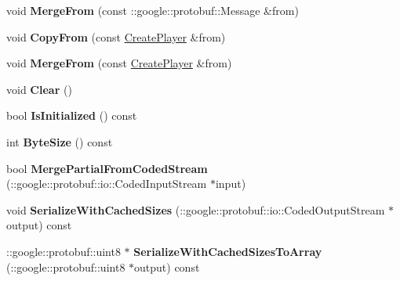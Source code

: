 \begin{DoxyCompactItemize}
\item 
\hypertarget{class_create_player_ac69c59b01e955b2f6b54b187d37645a4}{void {\bfseries Merge\-From} (const \-::google\-::protobuf\-::\-Message \&from)}\label{class_create_player_ac69c59b01e955b2f6b54b187d37645a4}

\item 
\hypertarget{class_create_player_a6a7ceed0bae191b7507404dee9440860}{void {\bfseries Copy\-From} (const \hyperlink{class_create_player}{Create\-Player} \&from)}\label{class_create_player_a6a7ceed0bae191b7507404dee9440860}

\item 
\hypertarget{class_create_player_a62af2ac4cd8c25d25fb40b24490dce71}{void {\bfseries Merge\-From} (const \hyperlink{class_create_player}{Create\-Player} \&from)}\label{class_create_player_a62af2ac4cd8c25d25fb40b24490dce71}

\item 
\hypertarget{class_create_player_a16a5331943d8f0cb80ea016c2f6536c1}{void {\bfseries Clear} ()}\label{class_create_player_a16a5331943d8f0cb80ea016c2f6536c1}

\item 
\hypertarget{class_create_player_aac130736c0a2910be7f7b502c41e1803}{bool {\bfseries Is\-Initialized} () const }\label{class_create_player_aac130736c0a2910be7f7b502c41e1803}

\item 
\hypertarget{class_create_player_a03f9cb31155e0379958b26d6ee0489d1}{int {\bfseries Byte\-Size} () const }\label{class_create_player_a03f9cb31155e0379958b26d6ee0489d1}

\item 
\hypertarget{class_create_player_ab0ef8132426cd05a7942ea70fdb3ef7b}{bool {\bfseries Merge\-Partial\-From\-Coded\-Stream} (\-::google\-::protobuf\-::io\-::\-Coded\-Input\-Stream $\ast$input)}\label{class_create_player_ab0ef8132426cd05a7942ea70fdb3ef7b}

\item 
\hypertarget{class_create_player_a9e670ed1b78c0db0c678bce985ca03e1}{void {\bfseries Serialize\-With\-Cached\-Sizes} (\-::google\-::protobuf\-::io\-::\-Coded\-Output\-Stream $\ast$output) const }\label{class_create_player_a9e670ed1b78c0db0c678bce985ca03e1}

\item 
\hypertarget{class_create_player_af968007dbfa9e09c137061676ff8013d}{\-::google\-::protobuf\-::uint8 $\ast$ {\bfseries Serialize\-With\-Cached\-Sizes\-To\-Array} (\-::google\-::protobuf\-::uint8 $\ast$output) const }\label{class_create_player_af968007dbfa9e09c137061676ff8013d}


\end{DoxyCompactItemize}
